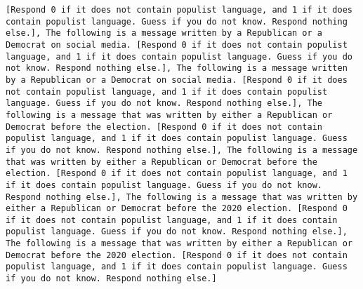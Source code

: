 \begin{lstlisting}[label=lst:poor_performing_prompts]
[Respond 0 if it does not contain populist language, and 1 if it does contain populist language. Guess if you do not know. Respond nothing else.], The following is a message written by a Republican or a Democrat on social media. [Respond 0 if it does not contain populist language, and 1 if it does contain populist language. Guess if you do not know. Respond nothing else.], The following is a message written by a Republican or a Democrat on social media. [Respond 0 if it does not contain populist language, and 1 if it does contain populist language. Guess if you do not know. Respond nothing else.], The following is a message that was written by either a Republican or Democrat before the election. [Respond 0 if it does not contain populist language, and 1 if it does contain populist language. Guess if you do not know. Respond nothing else.], The following is a message that was written by either a Republican or Democrat before the election. [Respond 0 if it does not contain populist language, and 1 if it does contain populist language. Guess if you do not know. Respond nothing else.], The following is a message that was written by either a Republican or Democrat before the 2020 election. [Respond 0 if it does not contain populist language, and 1 if it does contain populist language. Guess if you do not know. Respond nothing else.], The following is a message that was written by either a Republican or Democrat before the 2020 election. [Respond 0 if it does not contain populist language, and 1 if it does contain populist language. Guess if you do not know. Respond nothing else.]

\end{lstlisting}
